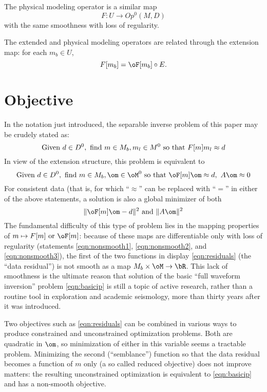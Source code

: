 The physical modeling operator is a similar map
\[
F:U \rightarrow Op^0(M,D)
\]
with the same smoothness with loss of regularity. 

The extended and physical modeling operators are related through the
extension map: for each $m_b \in U$,
\[
F[m_b] = \oF[m_b] \circ E.
\]

\section{Objective}
In the notation just introduced, the separable inverse problem of this
paper may be crudely stated as:
\begin{equation}
\label{eqn:basicip}
\mbox{Given }d\in D^0,\mbox{ find }m\in M_b,m_l \in M^0 \mbox{ so 
  that }\\
F[m]m_l \approx d 
\end{equation}
In view of the extension structure, this problem is equivalent to
\begin{equation}
\label{eqn:ip}
\mbox{Given }d\in D^0,\mbox{ find }m\in M_b,\om \in \oM^0 \mbox{ so 
  that }\\
\oF[m]\om \approx d, \,\,A\om \approx 0
\end{equation}
For consistent data (that is, for which ``$\approx$'' can be replaced
with ``$=$'' in either of the above statements, a solution is also a
global minimizer of both
\begin{equation}
\label{eqn:residuals}
\|\oF[m]\om - d\|^2 \mbox{ and } \|A\om\|^2
\end{equation}
The fundamental difficulty of this type of problem lies in the
mapping properties of $m \mapsto F[m] \mbox{ or } \oF[m]$: because of
these maps are differentiable only with loss of regularity (statements
\ref{eqn:nonsmooth1}, \ref{eqn:nonsmooth2}, and \ref{eqn:nonsmooth3}),
the first of the two functions in display \ref{eqn:residuals} (the
``data residual'') is not smooth as a map $M_b \times \oM \rightarrow
\bR$. This lack of smoothness is the ultimate reason that solution of the basic
``full waveform inversion'' problem \ref{eqn:basicip} is still a topic
of active research, rather than a routine tool in exploration and
academic seismology, more than thirty years after it was introduced.

Two objectives such as \ref{eqn:residuals} can be combined in various
ways to produce constrained and unconstrained optimization
problems. Both are quadratic in $\om$, so minimization of either in
this variable seems a tractable problem. Minimizing the second
(``semblance'') function so that the data residual becomes a function
of $m$ only (a so called reduced objective) does not improve matters:
the resulting unconstrained optimization is equivalent to
\ref{eqn:basicip} and has a non-smooth objective.

